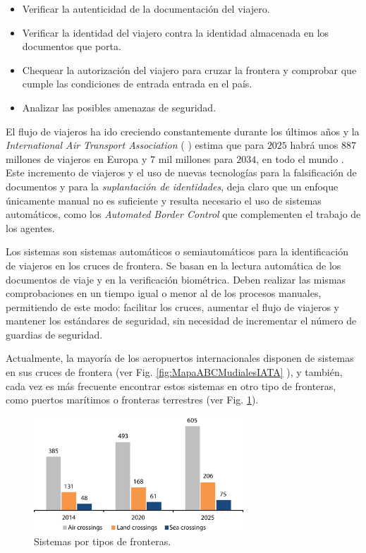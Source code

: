 \begin{itemize}
    \item
    Verificar la autenticidad de la documentación del viajero.
    \item
    Verificar la identidad del viajero contra la identidad almacenada en los documentos que porta.
    \item
    Chequear la autorización del viajero para cruzar la frontera y comprobar que cumple las condiciones de entrada entrada en el país. 
    \item
    Analizar las posibles amenazas de seguridad.
\end{itemize} 

El flujo de viajeros ha ido creciendo constantemente durante los últimos años y la \textit{International Air Transport Association} ( \cite{IATAOnline}) estima que para $2025$ habrá unos $887$ millones de viajeros en Europa y $7$ mil millones para $2034$, en todo el mundo \cite{IATA/REVIEW/2016}. Este incremento de viajeros y el uso de nuevas tecnologías para la falsificación de documentos y para la \textit{suplantación de identidades}, deja claro que un enfoque únicamente manual no es suficiente y resulta necesario el uso de sistemas automáticos, como los \textit{Automated Border Control}  que complementen el trabajo de los agentes.

Los sistemas  son sistemas automáticos o semiautomáticos para la identificación de viajeros en los cruces de frontera. Se basan en la lectura automática de los documentos de viaje y en la verificación biométrica. Deben realizar las mismas comprobaciones en un tiempo igual o menor al de los procesos manuales, permitiendo de este modo: facilitar los cruces, aumentar el flujo de viajeros y mantener los estándares de seguridad, sin necesidad de incrementar el número de guardias de seguridad.

Actualmente, la mayoría de los aeropuertos internacionales disponen de sistemas  en sus cruces de frontera (ver Fig. \ref{fig:MapaABCMudialesIATA} ), y también, cada vez es más frecuente encontrar estos sistemas en otro tipo de fronteras, como puertos marítimos o fronteras terrestres (ver Fig. \ref{fig:fronterasConABC}). 

\begin{figure}
    \centering
    \includegraphics[width=0.7\textwidth]{ch-sistemasABC/images/ch-SistemasABC/ABC_TipoFronteras.png}
    \caption{Sistemas  por tipos de fronteras.}
    \label{fig:fronterasConABC}
\end{figure}

